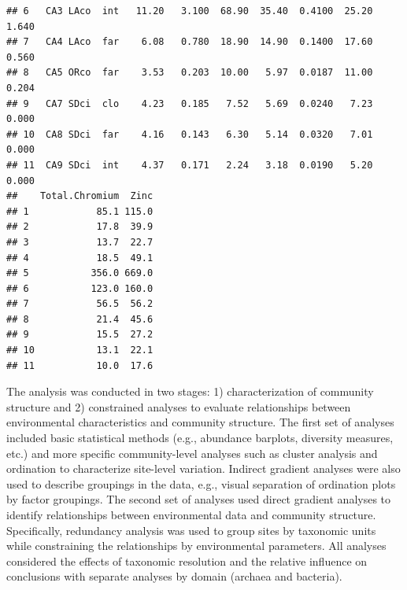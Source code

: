 \documentclass[letterpaper,12pt]{article}\usepackage[]{graphicx}\usepackage[]{color}
\makeatletter
\newenvironment{kframe}{%
 \def\at@end@of@kframe{}%
 \ifinner\ifhmode%
  \def\at@end@of@kframe{\end{minipage}}%
  \begin{minipage}{\columnwidth}%
 \fi\fi%
 \def\FrameCommand##1{\hskip\@totalleftmargin \hskip-\fboxsep
 \colorbox{shadecolor}{##1}\hskip-\fboxsep
     \hskip-\linewidth \hskip-\@totalleftmargin \hskip\columnwidth}%
 \MakeFramed {\advance\hsize-\width
   \@totalleftmargin\z@ \linewidth\hsize
   \@setminipage}}%
 {\par\unskip\endMakeFramed%
 \at@end@of@kframe}
\newenvironment{knitrout}{}{} %
\makeatother
\begin{document}
\begin{knitrout}
\begin{kframe}
\begin{verbatim}
## 6   CA3 LAco  int   11.20   3.100  68.90  35.40  0.4100  25.20  1.640
## 7   CA4 LAco  far    6.08   0.780  18.90  14.90  0.1400  17.60  0.560
## 8   CA5 ORco  far    3.53   0.203  10.00   5.97  0.0187  11.00  0.204
## 9   CA7 SDci  clo    4.23   0.185   7.52   5.69  0.0240   7.23  0.000
## 10  CA8 SDci  far    4.16   0.143   6.30   5.14  0.0320   7.01  0.000
## 11  CA9 SDci  int    4.37   0.171   2.24   3.18  0.0190   5.20  0.000
##    Total.Chromium  Zinc
## 1            85.1 115.0
## 2            17.8  39.9
## 3            13.7  22.7
## 4            18.5  49.1
## 5           356.0 669.0
## 6           123.0 160.0
## 7            56.5  56.2
## 8            21.4  45.6
## 9            15.5  27.2
## 10           13.1  22.1
## 11           10.0  17.6
\end{verbatim}
\end{kframe}
\end{knitrout}

The analysis was conducted in two stages: 1) characterization of community structure and 2) constrained analyses to evaluate relationships between environmental characteristics and community structure.  The first set of analyses included basic statistical methods (e.g., abundance barplots, diversity measures, etc.) and more specific community-level analyses such as cluster analysis and ordination to characterize site-level variation.  Indirect gradient analyses were also used to describe groupings in the data, e.g., visual separation of ordination plots by factor groupings.  The second set of analyses  used direct gradient analyses to identify relationships between environmental data and community structure.  Specifically, redundancy analysis was used to group sites by taxonomic units while constraining the relationships by environmental parameters.  All analyses considered the effects of taxonomic resolution and the relative influence on conclusions with separate analyses by domain (archaea and bacteria).
\end{document}
